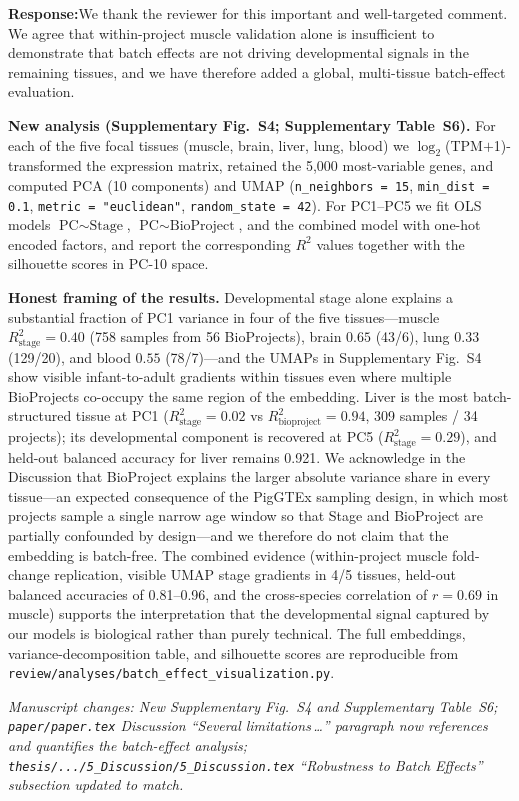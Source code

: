 \documentclass[11pt,a4paper]{article}
\newcommand{\response}[1]{%
  \par\vspace{2pt}\noindent\textbf{\textcolor{respcolor}{Response:}}\;\;#1\par\vspace{6pt}}
\newcommand{\changeloc}[1]{\par\noindent\textit{\small Manuscript changes: #1}\par}
\begin{document}
\response{We thank the reviewer for this important and well-targeted comment.
We agree that within-project muscle validation alone is insufficient to
demonstrate that batch effects are not driving developmental signals in the
remaining tissues, and we have therefore added a global, multi-tissue
batch-effect evaluation.

\textbf{New analysis (Supplementary Fig.~S4; Supplementary Table~S6).} For
each of the five focal tissues (muscle, brain, liver, lung, blood) we
$\log_2$(TPM$+$1)-transformed the expression matrix, retained the
5{,}000 most-variable genes, and computed PCA (10 components) and UMAP
(\texttt{n\_neighbors\,=\,15}, \texttt{min\_dist\,=\,0.1},
\texttt{metric\,=\,"euclidean"}, \texttt{random\_state\,=\,42}). For
PC1--PC5 we fit OLS models $\text{PC}\!\sim\!\text{Stage}$,
$\text{PC}\!\sim\!\text{BioProject}$, and the combined model with one-hot
encoded factors, and report the corresponding $R^2$ values together with
the silhouette scores in PC-10 space.

\textbf{Honest framing of the results.} Developmental stage alone
explains a substantial fraction of PC1 variance in four of the five
tissues---muscle $R^2_{\text{stage}}=0.40$ (758 samples from 56
BioProjects), brain $0.65$ (43/6), lung $0.33$ (129/20), and blood
$0.55$ (78/7)---and the UMAPs in Supplementary Fig.~S4 show visible
infant-to-adult gradients within tissues even where multiple BioProjects
co-occupy the same region of the embedding. Liver is the most
batch-structured tissue at PC1 ($R^2_{\text{stage}}=0.02$ vs
$R^2_{\text{bioproject}}=0.94$, 309 samples / 34 projects); its
developmental component is recovered at PC5
($R^2_{\text{stage}}=0.29$), and held-out balanced accuracy for liver
remains 0.921. We acknowledge in the Discussion that BioProject explains
the larger absolute variance share in every tissue---an expected
consequence of the PigGTEx sampling design, in which most projects
sample a single narrow age window so that Stage and BioProject are
partially confounded by design---and we therefore do not claim that the
embedding is batch-free. The combined evidence (within-project muscle
fold-change replication, visible UMAP stage gradients in 4/5 tissues,
held-out balanced accuracies of 0.81--0.96, and the cross-species
correlation of $r=0.69$ in muscle) supports the interpretation that
the developmental signal captured by our models is biological rather
than purely technical. The full embeddings, variance-decomposition table, and
silhouette scores are reproducible from
\texttt{review/analyses/batch\_effect\_visualization.py}.}
\changeloc{New Supplementary Fig.~S4 and Supplementary Table~S6;
\texttt{paper/paper.tex} Discussion ``Several limitations\,\ldots'' paragraph
now references and quantifies the batch-effect analysis;
\texttt{thesis/.../5\_Discussion/5\_Discussion.tex} ``Robustness to Batch
Effects'' subsection updated to match.}
\end{document}
